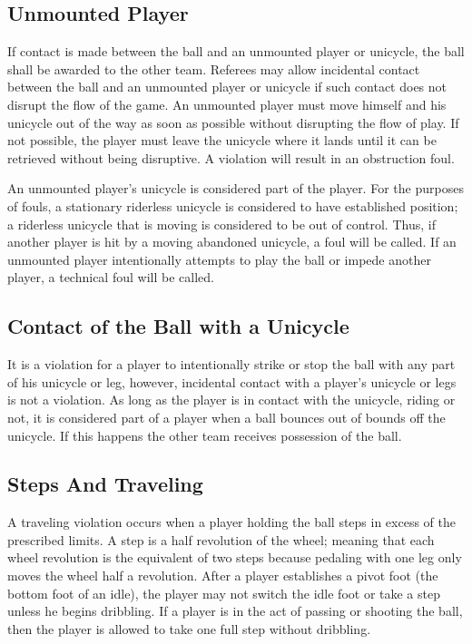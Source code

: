 \subsection{Unmounted Player}
If contact is made between the ball and an unmounted player or unicycle, the ball shall be awarded to the other team.
Referees may allow incidental contact between the ball and an unmounted player or unicycle if such contact does not disrupt the flow of the game.
An unmounted player must move himself and his unicycle out of the way as soon as possible
without disrupting the flow of play.
If not possible, the player must leave the unicycle where it lands until it can be retrieved without being disruptive.
A violation will result in an obstruction foul.

An unmounted player's unicycle is considered part of the player.
For the purposes of fouls, a stationary riderless unicycle is considered to have established position; a riderless unicycle that is moving is considered to be out of control.
Thus, if another player is hit by a moving abandoned unicycle, a foul will be called.
If an unmounted player intentionally attempts to play the ball or impede another player, a technical foul will be called.

\subsection{Contact of the Ball with a Unicycle}
It is a violation for a player to intentionally strike or stop the ball with any part of his unicycle or leg, however, incidental contact with a player's unicycle or legs is not a violation.
As long as the player is in contact with the unicycle, riding or not, it is considered part of a player when a ball bounces out of bounds off the unicycle.
If this happens the other team receives possession of the ball.

\subsection{Steps And Traveling}
A traveling violation occurs when a player holding the ball steps in excess of the prescribed limits.
A step is a half revolution of the wheel; meaning that each wheel revolution is the equivalent of two steps because pedaling with one leg only moves the wheel half a revolution.
After a player establishes a pivot foot (the bottom foot of an idle), the player may not switch the idle foot or take a step unless he begins dribbling.
If a player is in the act of passing or shooting the ball, then the player is allowed to take one full step without dribbling.

